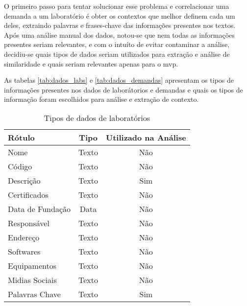 O primeiro passo para tentar solucionar esse problema e correlacionar uma demanda a um laboratório é obter os contextos que melhor definem cada um deles, extraindo palavras e frases-chave das informações presentes nos textos. Após uma análise manual dos dados, notou-se que nem todas as informações presentes seriam relevantes, e com o intuíto de evitar contaminar a análise, decidiu-se quais tipos de dados seriam utilizados para extração e análise de similaridade e quais seriam relevantes apenas para o \gls{mvp}.

As tabelas \autoref{tab:dados_labs} e \autoref{tab:dados_demandas} apresentam os tipos de informações presentes nos dados de laborátorios e demandas e quais os tipos de informação foram escolhidos para análise e extração de contexto.

\begin{table}[H]
    \caption{Tipos de dados de laboratórios}
    \label{tab:dados_labs}
    \begin{tabular}{lcc}
        \hline
        \textbf{Rótulo}  & \textbf{Tipo} & \textbf{Utilizado na Análise} \\ \hline
        Nome             & Texto         & Não                           \\
        Código           & Texto         & Não                           \\
        Descrição        & Texto         & Sim                           \\
        Certificados     & Texto         & Não                           \\
        Data de Fundação & Data          & Não                           \\
        Responsável      & Texto         & Não                           \\
        Endereço         & Texto         & Não                           \\
        Softwares        & Texto         & Não                           \\
        Equipamentos     & Texto         & Não                           \\
        Midias Sociais   & Texto         & Não                           \\
        Palavras Chave   & Texto         & Sim                           \\ \hline
    \end{tabular}
    \fonte{}
\end{table}

